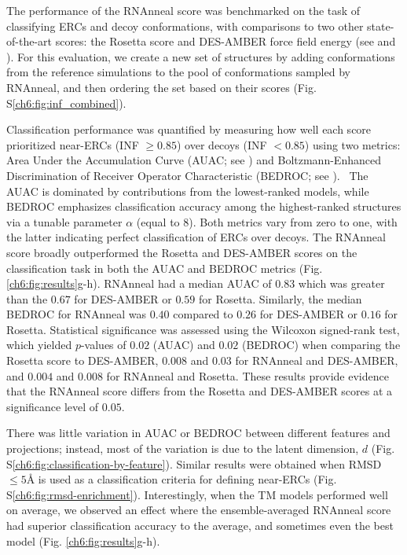The performance of the RNAnneal score was benchmarked on the task of classifying ERCs and decoy conformations, with comparisons to two other state-of-the-art scores: the Rosetta score and DES-AMBER force field energy (see  and ). For this evaluation, we create a new set of structures by adding conformations from the reference simulations to the pool of conformations sampled by RNAnneal, and then ordering the set based on their scores (Fig. S\ref{ch6:fig:inf_combined}).

Classification performance was quantified by measuring how well each score prioritized near-ERCs (INF $\geq 0.85$) over decoys (INF $< 0.85$) using two metrics: Area Under the Accumulation Curve (AUAC; see ) and Boltzmann-Enhanced Discrimination of Receiver Operator Characteristic (BEDROC; see ).~\cite{truchon2007bedroc} The AUAC is dominated by contributions from the lowest-ranked models, while BEDROC emphasizes classification accuracy among the highest-ranked structures via a tunable parameter $\alpha$ (equal to 8). Both metrics vary from zero to one, with the latter indicating perfect classification of ERCs over decoys. The RNAnneal score broadly outperformed the Rosetta and DES-AMBER scores on the classification task in both the AUAC and BEDROC metrics (Fig. \ref{ch6:fig:results}g-h). RNAnneal had a median AUAC of $0.83$ which was greater than the $0.67$ for DES-AMBER or $0.59$ for Rosetta. Similarly, the median BEDROC for RNAnneal was $0.40$ compared to $0.26$ for DES-AMBER or $0.16$ for Rosetta. Statistical significance was assessed using the Wilcoxon signed-rank test, which yielded $p$-values of $0.02$ (AUAC) and $0.02$ (BEDROC) when comparing the Rosetta score to DES-AMBER, $0.008$ and $0.03$ for RNAnneal and DES-AMBER, and $0.004$ and $0.008$ for RNAnneal and Rosetta. These results provide evidence that the RNAnneal score differs from the Rosetta and DES-AMBER scores at a significance level of $0.05$.

There was little variation in AUAC or BEDROC between different features and projections; instead, most of the variation is due to the latent dimension, $d$ (Fig. S\ref{ch6:fig:classification-by-feature}). Similar results were obtained when RMSD $\leq5${\AA} is used as a classification criteria for defining near-ERCs (Fig. S\ref{ch6:fig:rmsd-enrichment}). Interestingly, when the TM models performed well on average, we observed an effect where the ensemble-averaged RNAnneal score had superior classification accuracy to the average, and sometimes even the best model (Fig. \ref{ch6:fig:results}g-h).

